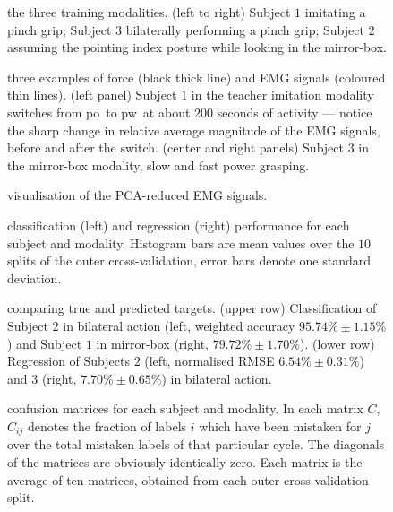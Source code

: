 \documentclass[review,authoryear]{elsarticle}
\def\po{\textsf{po}}
\def\pw{\textsf{pw}}
\begin{document}
\begin{figure}
  \caption{the three training modalities. (left to right) Subject $1$
    imitating a pinch grip; Subject $3$ bilaterally performing a pinch
    grip; Subject $2$ assuming the pointing index posture while
    looking in the mirror-box.}
  \label{fig:modalities}
\end{figure}

\begin{figure}
  \caption{three examples of force (black thick line) and EMG
    signals (coloured thin lines). (left panel) Subject $1$ in the teacher imitation
    modality switches from \po\ to \pw\ at about $200$ seconds of activity --- notice
    the sharp change in relative average magnitude of the EMG signals, before and after
    the switch. (center and right panels) Subject $3$ in the mirror-box modality, slow
    and fast power grasping.}
  \label{fig:examples}
\end{figure}

\begin{figure}
  \caption{visualisation of the PCA-reduced EMG signals.}
  \label{fig:PCA}
\end{figure}

\begin{figure}
  \caption{classification (left) and regression (right) performance
    for each subject and modality. Histogram bars are mean values over
    the $10$ splits of the outer cross-validation, error bars denote one
    standard deviation.}
  \label{fig:results}
\end{figure}

\begin{figure}
  \caption{comparing true and predicted targets. (upper row) Classification
    of Subject $2$ in bilateral action (left, weighted accuracy $95.74\% \pm
    1.15\%$) and Subject $1$ in mirror-box (right, $79.72\% \pm 1.70\%$).
    (lower row) Regression of Subjects $2$ (left, normalised RMSE $6.54\% \pm
    0.31\%$) and $3$ (right, $7.70\% \pm 0.65\%$) in bilateral action.}
  \label{fig:guess}
\end{figure}

\begin{figure}
  \caption{confusion matrices for each subject and modality.
    In each matrix $C$, $C_{ij}$ denotes the fraction of labels
    $i$ which have been mistaken for $j$ over the total mistaken
    labels of that particular cycle. The diagonals of the matrices
    are obviously identically zero. Each matrix is the average of
    ten matrices, obtained from each outer cross-validation split.}
  \label{fig:confusion}
\end{figure}
\end{document}
